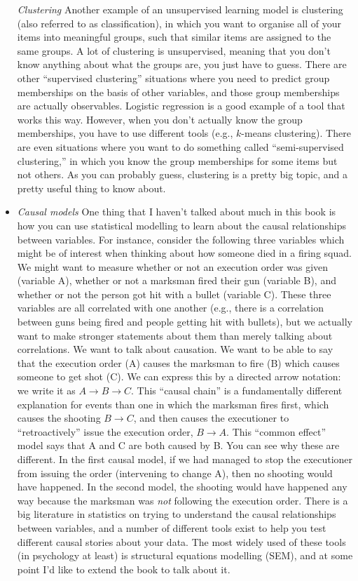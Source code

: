 \documentclass[
]{book}
\begin{document}
\begin{itemize}
  \emph{Clustering} Another example of an unsupervised learning model is clustering (also referred to as classification), in which you want to organise all of your items into meaningful groups, such that similar items are assigned to the same groups. A lot of clustering is unsupervised, meaning that you don't know anything about what the groups are, you just have to guess. There are other ``supervised clustering'' situations where you need to predict group memberships on the basis of other variables, and those group memberships are actually observables. Logistic regression is a good example of a tool that works this way. However, when you don't actually know the group memberships, you have to use different tools (e.g., \(k\)-means clustering). There are even situations where you want to do something called ``semi-supervised clustering,'' in which you know the group memberships for some items but not others. As you can probably guess, clustering is a pretty big topic, and a pretty useful thing to know about.
\item
  \emph{Causal models} One thing that I haven't talked about much in this book is how you can use statistical modelling to learn about the causal relationships between variables. For instance, consider the following three variables which might be of interest when thinking about how someone died in a firing squad. We might want to measure whether or not an execution order was given (variable A), whether or not a marksman fired their gun (variable B), and whether or not the person got hit with a bullet (variable C). These three variables are all correlated with one another (e.g., there is a correlation between guns being fired and people getting hit with bullets), but we actually want to make stronger statements about them than merely talking about correlations. We want to talk about causation. We want to be able to say that the execution order (A) causes the marksman to fire (B) which causes someone to get shot (C). We can express this by a directed arrow notation: we write it as \(A \rightarrow B \rightarrow C\). This ``causal chain'' is a fundamentally different explanation for events than one in which the marksman fires first, which causes the shooting \(B \rightarrow C\), and then causes the executioner to ``retroactively'' issue the execution order, \(B \rightarrow A\). This ``common effect'' model says that A and C are both caused by B. You can see why these are different. In the first causal model, if we had managed to stop the executioner from issuing the order (intervening to change A), then no shooting would have happened. In the second model, the shooting would have happened any way because the marksman was \emph{not} following the execution order. There is a big literature in statistics on trying to understand the causal relationships between variables, and a number of different tools exist to help you test different causal stories about your data. The most widely used of these tools (in psychology at least) is structural equations modelling (SEM), and at some point I'd like to extend the book to talk about it.
\end{itemize}
\end{document}
